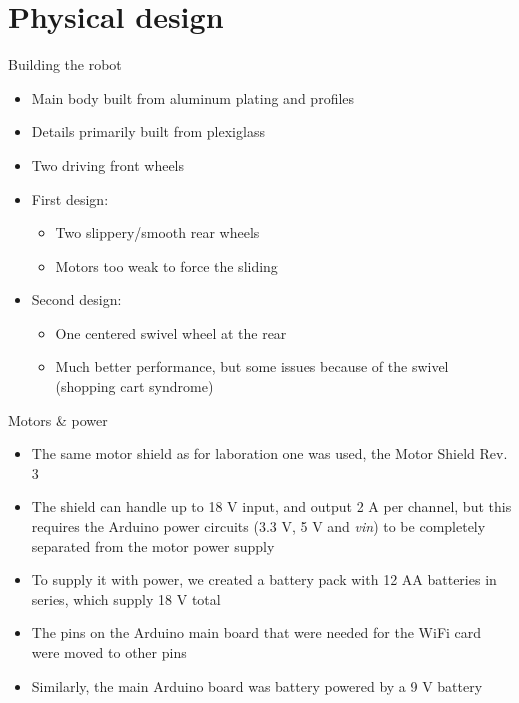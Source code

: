 \documentclass[12pt]{beamer}
\begin{document}
\section{Physical design}
\begin{frame}{Building the robot}
  \begin{itemize}
  \item<+-> Main body built from aluminum plating and profiles
    \item<+-> Details primarily built from plexiglass
  \item<+-> Two driving front wheels
    
  \item<+-> First design:
  \begin{itemize}
  \item<+-> Two slippery/smooth rear wheels
  \item<+->[$\Rightarrow$] Motors too weak to force the sliding
    
  \end{itemize}
  \item<+-> Second design:
  \begin{itemize}
  \item<+-> One centered swivel wheel at the rear
    \item<+->[$\Rightarrow$] Much better performance, but some issues because of the swivel (shopping cart syndrome)
  \end{itemize}
  \end{itemize}
\end{frame}

\begin{frame}{Motors \& power}
  \begin{itemize}
  \item<+-> The same motor shield as for laboration one was used, the Motor Shield Rev. 3 \cite{motorshield}
  \item<+-> The shield can handle up to 18 V input, and output 2 A per channel, but this requires the Arduino power circuits (3.3 V, 5 V and \emph{vin}) to be completely separated from the motor power supply
  \item<+-> To supply it with power, we created a battery pack with 12 AA batteries in series, which supply 18 V total
  \item<+-> The pins on the Arduino main board that were needed for the WiFi card were moved to other pins
    \item<+-> Similarly, the main Arduino board was battery powered by a 9 V battery
  \end{itemize}
  \end{frame}
\end{document}
